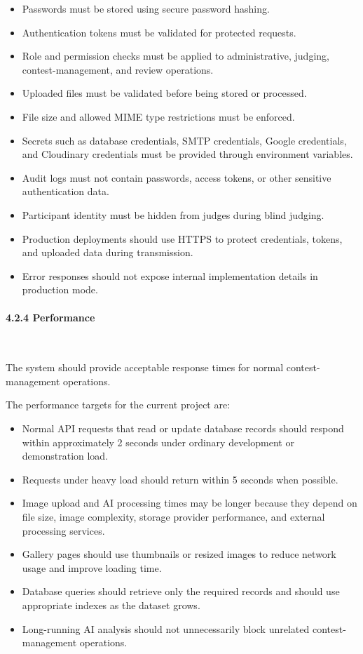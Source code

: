 \begin{itemize}[leftmargin=1.5em, nosep]
    \item Passwords must be stored using secure password hashing.
    \item Authentication tokens must be validated for protected requests.
    \item Role and permission checks must be applied to administrative, judging, contest-management, and review operations.
    \item Uploaded files must be validated before being stored or processed.
    \item File size and allowed MIME type restrictions must be enforced.
    \item Secrets such as database credentials, SMTP credentials, Google credentials, and Cloudinary credentials must be provided through environment variables.
    \item Audit logs must not contain passwords, access tokens, or other sensitive authentication data.
    \item Participant identity must be hidden from judges during blind judging.
    \item Production deployments should use HTTPS to protect credentials, tokens, and uploaded data during transmission.
    \item Error responses should not expose internal implementation details in production mode.
\end{itemize}

\paragraph*{4.2.4 Performance}\leavevmode\\[-0.5em]
\label{par:performance}

The system should provide acceptable response times for normal contest-management operations.

The performance targets for the current project are:

\begin{itemize}[leftmargin=1.5em, nosep]
    \item Normal API requests that read or update database records should respond within approximately 2 seconds under ordinary development or demonstration load.
    \item Requests under heavy load should return within 5 seconds when possible.
    \item Image upload and AI processing times may be longer because they depend on file size, image complexity, storage provider performance, and external processing services.
    \item Gallery pages should use thumbnails or resized images to reduce network usage and improve loading time.
    \item Database queries should retrieve only the required records and should use appropriate indexes as the dataset grows.
    \item Long-running AI analysis should not unnecessarily block unrelated contest-management operations.
\end{itemize}

